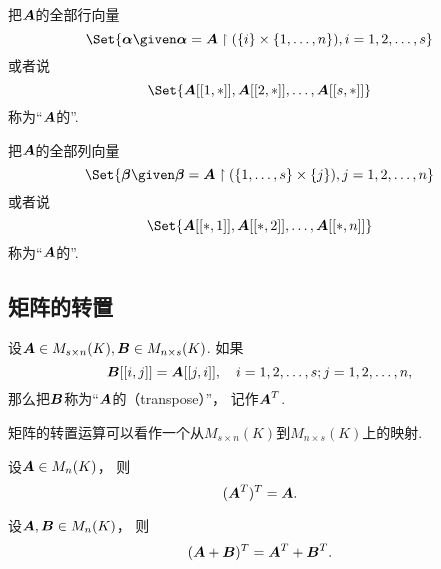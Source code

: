 把\(\boldsymbol{A}\)的全部行向量\begin{equation*}
	\Set{
		\vb\alpha
		\given
		\vb\alpha = \vb{A} \SetRestrict (\{i\}\times\{1,\dotsc,n\}),
		i=1,2,\dotsc,s
	}
\end{equation*}
或者说\begin{equation*}
	\Set{
		\MatrixEntry{\vb{A}}{1,*},
		\MatrixEntry{\vb{A}}{2,*},
		\dotsc,
		\MatrixEntry{\vb{A}}{s,*}
	}
\end{equation*}
称为“\(\boldsymbol{A}\)的”.

把\(\boldsymbol{A}\)的全部列向量\begin{equation*}
	\Set{
		\vb\beta
		\given
		\vb\beta = \vb{A} \SetRestrict (\{1,\dotsc,s\}\times\{j\}),
		j=1,2,\dotsc,n
	}
\end{equation*}
或者说\begin{equation*}
	\Set{
		\MatrixEntry{\vb{A}}{*,1},
		\MatrixEntry{\vb{A}}{*,2},
		\dotsc,
		\MatrixEntry{\vb{A}}{*,n}
	}
\end{equation*}
称为“\(\boldsymbol{A}\)的”.

\subsection{矩阵的转置}
\begin{definition}
设\(\boldsymbol{A} \in M_{s \times n}(K),
\boldsymbol{B}\in M_{n \times s}(K)\).
如果\begin{equation*}
	\boldsymbol{B}[[i,j]]
	= \boldsymbol{A}[[j,i]],
	\quad i=1,2,\dotsc,s;j=1,2,\dotsc,n,
\end{equation*}
那么把\(\boldsymbol{B}\)称为“\(\boldsymbol{A}\)的（transpose）”，
记作\(\boldsymbol{A}^T\).
\end{definition}
\begin{remark}
矩阵的转置运算可以看作一个从\(M_{s \times n}(K)\)到\(M_{n \times s}(K)\)上的映射.
\end{remark}

\begin{property}\label{theorem:矩阵的转置.性质1}
设\(\boldsymbol{A} \in M_n(K)\)，
则\begin{equation}
	(\boldsymbol{A}^T)^T = \boldsymbol{A}.
\end{equation}
\end{property}

\begin{property}\label{theorem:矩阵的转置.性质2}
设\(\boldsymbol{A},\boldsymbol{B} \in M_n(K)\)，
则\begin{equation}
	(\boldsymbol{A}+\boldsymbol{B})^T = \boldsymbol{A}^T + \boldsymbol{B}^T.
\end{equation}
\end{property}

